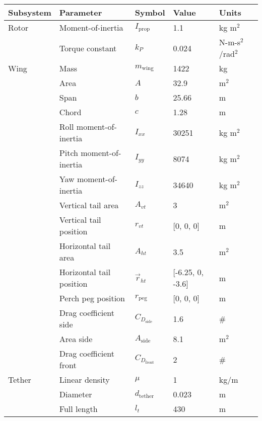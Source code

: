 \documentclass[11pt]{amsart}
\begin{document}
\begin{center}
  \begin{table}[h]
    \begin{tabular}{lllll}
      \hline
      \hline
      Subsystem & Parameter & Symbol & Value & Units \\
      \hline
      Rotor  & Moment-of-inertia & $I_{\mathrm{prop}}$ & 1.1 & kg m$^2$ \\
             & Torque constant & $k_P$ & 0.024 & N-m-s$^2$/rad$^2$ \\
      Wing   & Mass & $m_{\mathrm{wing}}$ & 1422 & kg \\
             & Area & $A$ & 32.9 & m$^2$ \\
             & Span & $b$ & 25.66 & m \\
             & Chord & $c$ & 1.28 & m \\
             & Roll moment-of-inertia & $I_{xx}$ & 30251 & kg m$^2$ \\
             & Pitch moment-of-inertia & $I_{yy}$ & 8074 & kg m$^2$ \\
             & Yaw moment-of-inertia & $I_{zz}$ & 34640 & kg m$^2$ \\
             & Vertical tail area & $A_{vt}$ & 3 & m$^2$ \\
             & Vertical tail position & $r_{vt}$ & [0, 0, 0] & m \\
             & Horizontal tail area & $A_{ht}$ & 3.5 & m$^2$ \\
             & Horizontal tail position & $\vec{r}_{ht}$ & [-6.25, 0, -3.6] & m \\
             & Perch peg position & $r_{\mathrm{peg}}$ & [0, 0, 0] & m \\
             & Drag coefficient side & $C_{D_{\mathrm{side}}}$ & 1.6 & \# \\
             & Area side & $A_{\mathrm{side}}$ & 8.1 & m$^2$ \\
             & Drag coefficient front & $C_{D_{\mathrm{front}}}$ & 2 & \# \\
      Tether & Linear density & $\mu$ & 1 & kg/m \\
             & Diameter & $d_{\mathrm{tether}}$ & 0.023 & m \\
             & Full length & $l_t$ & 430 & m \\

      \hline
      \hline
    \end{tabular}
  \end{table}
\end{center}
\end{document}
